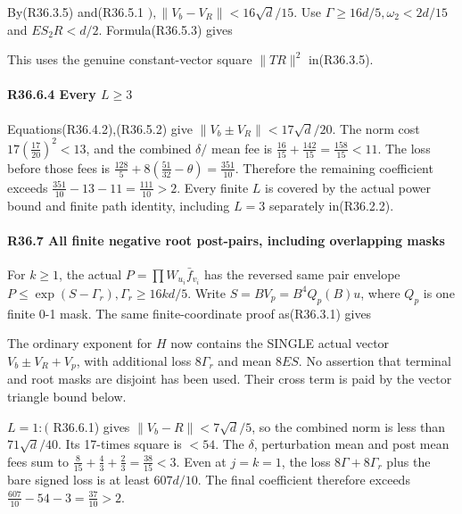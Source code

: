 By(R36.3.5) and(R36.5.1 \(),\allowbreak \allowbreak  \lVert V_b-V_R\rVert <16\sqrt{d}/15\). Use \(\Gamma\ge 16d/5,\allowbreak \allowbreak  \omega_2<2d/15\) and \(E S_2 R<d/2\). Formula(R36.5.3) gives


This uses the genuine constant-vector square \(\lVert TR\rVert ^2\) in(R36.3.5).

\paragraph{R36.6.4 Every \(L\ge 3\)}

Equations(R36.4.2),(R36.5.2) give \(\lVert V_b\pm V_R\rVert <17\sqrt{d}/20\). The norm cost \(17(\frac{17}{20})^2<13\), and the combined \(\delta/\) mean fee is \(\frac{16}{15}+\frac{142}{15}=\frac{158}{15}<11\). The loss before those fees is \(\frac{128}{5}+8(\frac{51}{32}-\theta)=\frac{351}{10}\). Therefore the remaining coefficient exceeds \(\frac{351}{10}-13-11=\frac{111}{10}>2\). Every finite \(L\) is covered by the actual power bound and finite path identity, including \(L=3\) separately in(R36.2.2).

\paragraph{R36.7 All finite negative root post-pairs, including overlapping masks}

For \(k\ge 1\), the actual \(P=\prod W_{u_{i}} \bar f_{v_{i}}\) has the reversed same pair envelope \(P\le \exp(S-\Gamma_r),\allowbreak \allowbreak  \Gamma_r\ge 16kd/5\). Write \(S=B V_p=B^4  Q_p(B)u\), where \(Q_p\) is one finite 0-1 mask. The same finite-coordinate proof as(R36.3.1) gives


The ordinary exponent for \(H\) now contains the SINGLE actual vector \(V_b\pm V_R+V_p\), with additional loss \(8\Gamma_r\) and mean \(8ES\). No assertion that terminal and root masks are disjoint has been used. Their cross term is paid by the vector triangle bound below.

\(L=1: (\) R36.6.1) gives \(\lVert V_b-R\rVert <7\sqrt{d}/5\), so the combined norm is less than \(71\sqrt{d}/40\). Its 17-times square is \(<54\). The \(\delta\), perturbation mean and post mean fees sum to \(\frac{8}{15}+\frac{4}{3}+\frac{2}{3}=\frac{38}{15}<3\). Even at \(j=k=1\), the loss \(8\Gamma+8\Gamma_r\) plus the bare signed loss is at least \(607d/10\). The final coefficient therefore exceeds \(\frac{607}{10}-54-3=\frac{37}{10}>2\).

